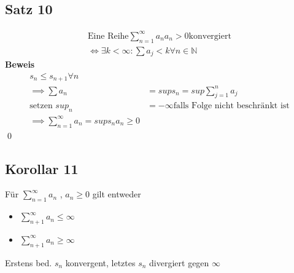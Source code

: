 \documentclass[fleqn]{scrbook}
\newcommand{\N}{\mathbb{N}}
\newcommand{\sumOI}{\sum_{n=1}^{\infty}}
\renewenvironment{proof}{{\bfseries Beweis }}{\qed}
\begin{document}
\subsection{Satz 10}
  \begin{equation}
    \begin{split}
      \text{Eine Reihe} \sumOI a_n a_n>0 \text{konvergiert} \\
      \Leftrightarrow \exists k < \infty : \sum a_j < k \forall n \in \N
    \end{split}
  \end{equation}
  \begin{proof}
    \begin{equation}
      \begin{split}
	s_n \le s_{n+1} \forall n \\
	\implies \sum a_n &= sup s_n = sup \sum_{j=1}^{n} a_j \\
	\text{setzen }sup_n &= -\infty \text{falls Folge nicht beschränkt ist} \\
	\implies \sumOI a_n = sup s_n a_n \ge 0
      \end{split}
    \end{equation}
  \end{proof}

\subsection{Korollar 11}
  Für $\sumOI a_n $ , $a_n \ge 0$ gilt entweder
  \begin{itemize}
    \item $\sum_{n+1}^{\infty} a_n \le \infty$
    \item $\sum_{n+1}^{\infty} a_n \ge \infty$
  \end{itemize}
  Erstens bed. $s_n$ konvergent, letztes $s_n$ divergiert gegen $\infty$
\end{document}

